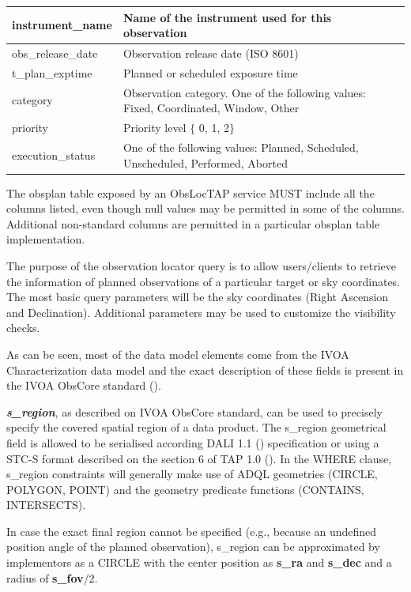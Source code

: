 \documentclass[11pt,a4paper]{ivoa}
\begin{document}
\begin{landscape}
\begin{table}
\begin{tabular}{ |l|l|l|l| }
instrument\_name &
Name of the instrument used for this observation \\
\hline
obs\_release\_date &
Observation release date (ISO 8601) \\
\hline
t\_plan\_exptime &
Planned or scheduled exposure time \\
\hline
category &
Observation category. One of the following values: Fixed, Coordinated, Window, 
Other \\
\hline
priority &
Priority level $ \{ $ 0, 1, 2$ \} $ \\
\hline
execution\_status &
One of the following values:  Planned, Scheduled, Unscheduled, Performed, Aborted \\
\hline
\end{tabular}
\end{table}
\end{landscape}

The obsplan table exposed by an ObsLocTAP service MUST include all 
the columns listed, even though null values may be permitted in some
of the columns. Additional non-standard columns are permitted in a 
particular obsplan table implementation.

The purpose of the observation locator query is to allow users/clients to
retrieve the information of planned observations of a particular target or
sky coordinates. The most basic query parameters will be the sky coordinates
(Right Ascension and Declination). Additional parameters may be used to
customize the visibility checks.

As can be seen, most of the data model elements come from the IVOA
Characterization data model and the exact description of these fields is
present in the IVOA ObsCore standard (\citealt{2017ivoa.spec.0509L}).

\textbf{\textit{s\_region}}, as described on IVOA ObsCore standard, can be
used to precisely specify the covered spatial region of a data product. The
s\_region geometrical field is allowed to be serialised according DALI 1.1
(\citealt{std:DALI}) specification or using a STC-S format
described on the section 6 of TAP 1.0 
(\citealt{2011ivoa.spec.1028T}). In
the WHERE clause, s\_region constraints will generally make use of ADQL
geometries (CIRCLE, POLYGON, POINT) and the geometry predicate functions
(CONTAINS, INTERSECTS).

In case the exact final region cannot be specified (e.g., because an undefined
position angle of the planned observation), s\_region can be approximated by
implementors as a CIRCLE with the center position as \textbf{s\_ra} and
\textbf{s\_dec} and a radius of \textbf{s\_fov}/2.
\end{document}
